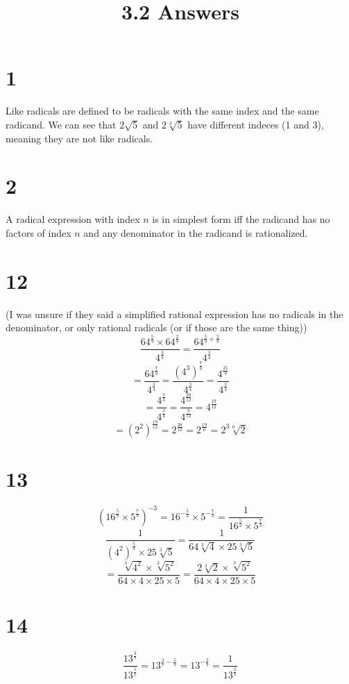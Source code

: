\documentclass{article}
\title{3.2 Answers}
\theoremstyle{definition}
\begin{document}
\maketitle


\section*{1}
Like radicals are defined to be radicals with the same index and the same radicand. We can see that $2\sqrt{5}$ and $2\sqrt[3]{5}$ have different 
indeces (1 and 3), meaning they are not like radicals.

\section*{2}
A radical expression with index $n$ is in simplest form iff the radicand has no factors of index $n$ and any denominator in the radicand is 
rationalized.

\section*{12}
(I was unsure if they said a simplified rational expression has no radicals in the denominator, or only rational radicals (or if those are the same thing))
\newline
\[ \frac{64^\frac{5}{9}\times 64^\frac{2}{9}}{4^\frac{3}{4}}=\frac{64^{\frac{5}{9}+\frac{2}{9}}}{4^\frac{3}{4}} \]
\[ =\frac{64^\frac{7}{9}}{4^\frac{3}{4}}=\frac{(4^3)^\frac{7}{9}}{4^\frac{3}{4}}=\frac{4^\frac{21}{9}}{4^\frac{3}{4}} \]
\[ =\frac{4^\frac{7}{3}}{4^\frac{3}{4}}=\frac{4^\frac{28}{12}}{4^\frac{9}{12}}=4^\frac{19}{12} \]
\[ =(2^2)^\frac{19}{12}=2^\frac{38}{12}=2^\frac{19}{6}=2^3\sqrt[6]{2} \]

\section*{13}
\[ (16^\frac{5}{9}\times 5^\frac{7}{9})^{-3}=16^{-\frac{5}{3}}\times 5^{-\frac{7}{3}}=\frac{1}{16^\frac{5}{3}\times 5^\frac{7}{3}} \]
\[ \frac{1}{(4^2)^\frac{5}{3}\times 25\sqrt[3]{5}}=\frac{1}{64\sqrt[3]{4}\times 25\sqrt[3]{5}} \]
\[ =\frac{\sqrt[3]{4^2}\times \sqrt[3]{5^2}}{64\times 4\times 25\times 5}=\frac{2\sqrt[3]{2}\times \sqrt[3]{5^2}}{64\times 4\times 25\times 5} \]

\section*{14}
\[ \frac{13^\frac{3}{7}}{13^\frac{5}{7}}=13^{\frac{3}{7}-\frac{5}{7}}=13^{-\frac{2}{7}}=\frac{1}{13^\frac{2}{7}} \]
\end{document}

